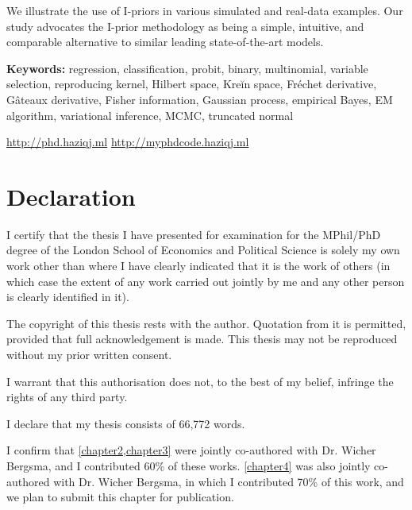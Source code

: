 \documentclass[11pt,twoside,openright,showframe]{report}
\begin{document}
We illustrate the use of I-priors in various simulated and real-data examples. 
Our study advocates the I-prior methodology as being a simple, intuitive, and comparable alternative to similar leading state-of-the-art models. 


\vspace{1em}
{\noindent\textbf{Keywords:} 
	regression, classification, probit, binary, multinomial, variable selection, reproducing kernel, Hilbert space, Kreĭn space, Fréchet derivative, Gâteaux derivative, Fisher information, Gaussian process, empirical Bayes, EM algorithm, variational inference, MCMC, truncated normal
}

\vfill

\begin{center}
  \url{http://phd.haziqj.ml} \textbullet{} \url{http://myphdcode.haziqj.ml}
\end{center}

\chapter*{Declaration} 

I certify that the thesis I have presented for examination for the MPhil/PhD degree of the London School of Economics and Political Science is solely my own work other than where I have clearly indicated that it is the work of others (in which case the extent of any work carried out jointly by me and any other person is clearly identified in it).

The copyright of this thesis rests with the author. Quotation from it is permitted, provided that full acknowledgement is made. 
This thesis may not be reproduced without my prior written consent.

I warrant that this authorisation does not, to the best of my belief, infringe the rights of any third party.

I declare that my thesis consists of 66,772 words.

I confirm that \cref{chapter2,chapter3} were jointly co-authored with Dr. Wicher Bergsma, and I contributed 60\% of these works.
\cref{chapter4} was also jointly co-authored with Dr. Wicher Bergsma, in which I contributed 70\% of this work, and we plan to submit this chapter for publication.
\end{document}
